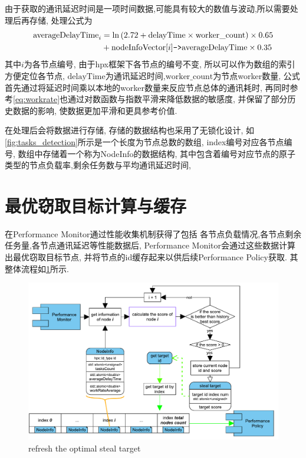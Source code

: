 \documentclass{mproj}
\begin{document}
由于获取的通讯延迟时间是一项时间数据,可能具有较大的数值与波动,所以需要处理后再存储,
处理公式为
\begin{align}
    \text{averageDelayTime}_i & = \ln\left(2.72 + \text{delayTime} \times \text{worker\_count}\right) \times 0.65 \notag               \\
                              & + \text{nodeInfoVector}[i]\texttt{->}\text{averageDelayTime} \times 0.35   \label{eq:averageDelayTime}
\end{align}
其中$i$为各节点编号,
由于hpx框架下各节点的编号不变,
所以可以作为数组的索引方便定位各节点,
$\text{delayTime}$为通讯延迟时间,$\text{worker\_count}$为节点worker数量,
公式首先通过将延迟时间乘以本地的worker数量来反应节点总体的通讯耗时,
再同时参考\cref{eq:workrate}也通过对数函数与指数平滑来降低数据的敏感度,
并保留了部分历史数据的影响,
使数据更加平滑和更具参考价值.

在处理后会将数据进行存储,
存储的数据结构也采用了无锁化设计,
如\cref{fig:tasks_detection}所示是一个长度为节点总数的数组,
index编号对应各节点编号,
数组中存储着一个称为NodeInfo的数据结构,
其中包含着编号对应节点的原子类型的节点负载率,剩余任务数与平均通讯延迟时间,

\section{最优窃取目标计算与缓存}

在Performance Monitor通过性能收集机制获得了包括
各节点负载情况,各节点剩余任务量,各节点通讯延迟等性能数据后,
Performance Monitor会通过这些数据计算出最优窃取目标节点,
并将节点的id缓存起来以供后续Performance Policy获取.
其整体流程如\cref{fig:refresh_target}所示.

\begin{figure}[h]
    \centering %
    \includegraphics[width=1\textwidth]{images/refresh_target.pdf} %
    \caption{refresh the optimal steal target} %
    \label{fig:refresh_target} %
\end{figure}
\FloatBarrier
\end{document}
